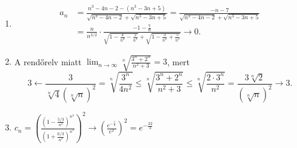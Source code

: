 \documentclass[11pt]{scrartcl}
\begin{document}
\begin{enumerate}
	\item \[
		      \begin{aligned}
			      a_n
			       & =
			      \frac{n^3 - 4n - 2 - (n^3 - 3n + 5)}{\sqrt{n^3 - 4n - 2} + \sqrt{n^3 - 3n + 5}}
			      =
			      \frac{-n - 7}{\sqrt{n^3 - 4n - 2} + \sqrt{n^3 - 3n + 5}} \\
			       & =
			      \frac{n}{n^{3/2}} \cdot
			      \frac{-1 - \frac{7}{n}}{
				      \sqrt{1 - \frac{4}{n^2} - \frac{2}{n^3}} + \sqrt{1 - \frac{3}{n^2} + \frac{5}{n^3}}
			      }
			      \to 0.
		      \end{aligned}
	      \]

	\item A rendőrelv miatt
	      \(\displaystyle
	      \lim_{n \to \infty} \sqrt[n]{\frac{3^n + 2^n}{n^2 + 3}} = 3
	      \), mert
	      \[
		      3
		      \leftarrow
		      \frac{3}{\sqrt[n]{4} \left(\sqrt[n]{n}\right)^2}
		      =
		      \sqrt[n]{\frac{3^n}{4n^2}}
		      \le
		      \sqrt[n]{\frac{3^n + 2^n}{n^2 + 3}}
		      \le
		      \sqrt[n]{\frac{2 \cdot 3^n}{n^2}}
		      =
		      \frac{3 \sqrt[n]{2}}{\left(\sqrt[n]{n}\right)^2}
		      \to
		      3.
	      \]

	\item \(\displaystyle
	      c_n
	      = \left(
	      \frac{\left(1 - \frac{5/3}{n^3}\right)^{n^3}}{\left(1 + \frac{6/3}{n^3}\right)^{n^3}}
	      \right)^2
	      \to
	      \left( \frac{e^{-\frac{5}{3}}}{e^2} \right)^2
	      = e^{-\frac{22}{3}}
	      \)

\end{enumerate}
\end{document}
